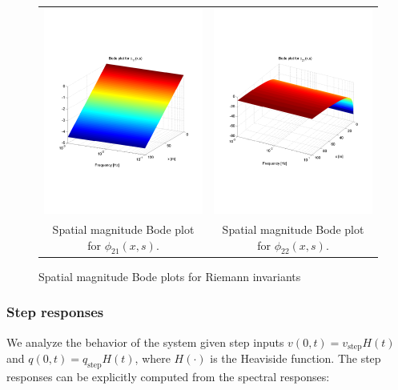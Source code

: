 \documentclass[preprint]{elsarticle}
\begin{document}
\begin{figure}
\centering
\begin{tabular}{cc}
\includegraphics[trim = 0mm 60mm 0mm 60mm, width = 8cm]{diagdistr11freeflow}
&
\includegraphics[trim = 0mm 60mm 0mm 60mm, width = 8cm]{diagdistr21freeflow}
\tabularnewline
Spatial magnitude Bode plot for $\phi_{21}(x,s)$.
&
Spatial magnitude Bode plot for $\phi_{22}(x,s)$.
\tabularnewline
\end{tabular}
\caption{Spatial magnitude Bode plots for Riemann invariants\label{Magn_spatial_diag}}
\end{figure}

\subsubsection{Step responses}
We analyze the behavior of the system given step inputs $v(0,t)=v_{\text{step}}H(t)$ and $q(0,t)=q_{\text{step}}H(t)$, where $H(\cdot)$ is the Heaviside function. The step responses can be explicitly computed from the spectral responses:
\end{document}
